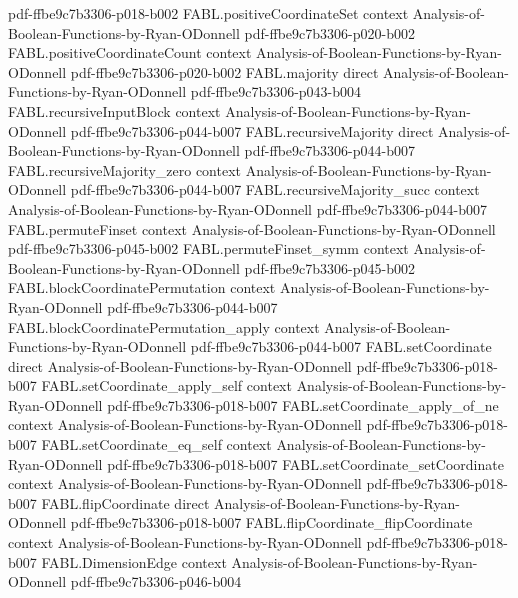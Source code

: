 \begin{theorem}
  {pdf-ffbe9c7b3306-p018-b002}
\proofstep
  {FABL.positiveCoordinateSet}
  {context}
  {Analysis-of-Boolean-Functions-by-Ryan-ODonnell}
  {pdf-ffbe9c7b3306-p020-b002}
\proofstep
  {FABL.positiveCoordinateCount}
  {context}
  {Analysis-of-Boolean-Functions-by-Ryan-ODonnell}
  {pdf-ffbe9c7b3306-p020-b002}
\proofstep
  {FABL.majority}
  {direct}
  {Analysis-of-Boolean-Functions-by-Ryan-ODonnell}
  {pdf-ffbe9c7b3306-p043-b004}
\proofstep
  {FABL.recursiveInputBlock}
  {context}
  {Analysis-of-Boolean-Functions-by-Ryan-ODonnell}
  {pdf-ffbe9c7b3306-p044-b007}
\proofstep
  {FABL.recursiveMajority}
  {direct}
  {Analysis-of-Boolean-Functions-by-Ryan-ODonnell}
  {pdf-ffbe9c7b3306-p044-b007}
\proofstep
  {FABL.recursiveMajority_zero}
  {context}
  {Analysis-of-Boolean-Functions-by-Ryan-ODonnell}
  {pdf-ffbe9c7b3306-p044-b007}
\proofstep
  {FABL.recursiveMajority_succ}
  {context}
  {Analysis-of-Boolean-Functions-by-Ryan-ODonnell}
  {pdf-ffbe9c7b3306-p044-b007}
\proofstep
  {FABL.permuteFinset}
  {context}
  {Analysis-of-Boolean-Functions-by-Ryan-ODonnell}
  {pdf-ffbe9c7b3306-p045-b002}
\proofstep
  {FABL.permuteFinset_symm}
  {context}
  {Analysis-of-Boolean-Functions-by-Ryan-ODonnell}
  {pdf-ffbe9c7b3306-p045-b002}
\proofstep
  {FABL.blockCoordinatePermutation}
  {context}
  {Analysis-of-Boolean-Functions-by-Ryan-ODonnell}
  {pdf-ffbe9c7b3306-p044-b007}
\proofstep
  {FABL.blockCoordinatePermutation_apply}
  {context}
  {Analysis-of-Boolean-Functions-by-Ryan-ODonnell}
  {pdf-ffbe9c7b3306-p044-b007}
\proofstep
  {FABL.setCoordinate}
  {direct}
  {Analysis-of-Boolean-Functions-by-Ryan-ODonnell}
  {pdf-ffbe9c7b3306-p018-b007}
\proofstep
  {FABL.setCoordinate_apply_self}
  {context}
  {Analysis-of-Boolean-Functions-by-Ryan-ODonnell}
  {pdf-ffbe9c7b3306-p018-b007}
\proofstep
  {FABL.setCoordinate_apply_of_ne}
  {context}
  {Analysis-of-Boolean-Functions-by-Ryan-ODonnell}
  {pdf-ffbe9c7b3306-p018-b007}
\proofstep
  {FABL.setCoordinate_eq_self}
  {context}
  {Analysis-of-Boolean-Functions-by-Ryan-ODonnell}
  {pdf-ffbe9c7b3306-p018-b007}
\proofstep
  {FABL.setCoordinate_setCoordinate}
  {context}
  {Analysis-of-Boolean-Functions-by-Ryan-ODonnell}
  {pdf-ffbe9c7b3306-p018-b007}
\proofstep
  {FABL.flipCoordinate}
  {direct}
  {Analysis-of-Boolean-Functions-by-Ryan-ODonnell}
  {pdf-ffbe9c7b3306-p018-b007}
\proofstep
  {FABL.flipCoordinate_flipCoordinate}
  {context}
  {Analysis-of-Boolean-Functions-by-Ryan-ODonnell}
  {pdf-ffbe9c7b3306-p018-b007}
\proofstep
  {FABL.DimensionEdge}
  {context}
  {Analysis-of-Boolean-Functions-by-Ryan-ODonnell}
  {pdf-ffbe9c7b3306-p046-b004}
\proofstep

\end{theorem}
